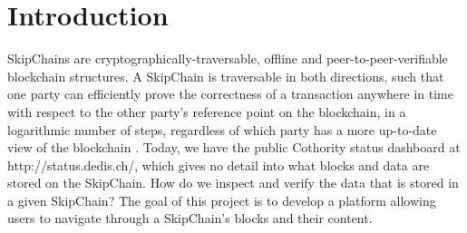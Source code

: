 \section{Introduction}


SkipChains are cryptographically-traversable, offline and peer-to-peer-verifiable blockchain structures. A SkipChain is traversable in both directions, such that one party can efficiently prove the correctness of a transaction anywhere in time with respect to the other party's reference point on the blockchain, in a logarithmic number of steps, regardless of which party has a more up-to-date view of the blockchain \cite{blog}.
Today, we have the public Cothority status dashboard at http://status.dedis.ch/, which gives no detail into what blocks and data are stored on the SkipChain. How do we inspect and verify the data that is stored in a given SkipChain? The goal of this project is to develop a platform allowing users to navigate through a SkipChain's blocks and their content.
